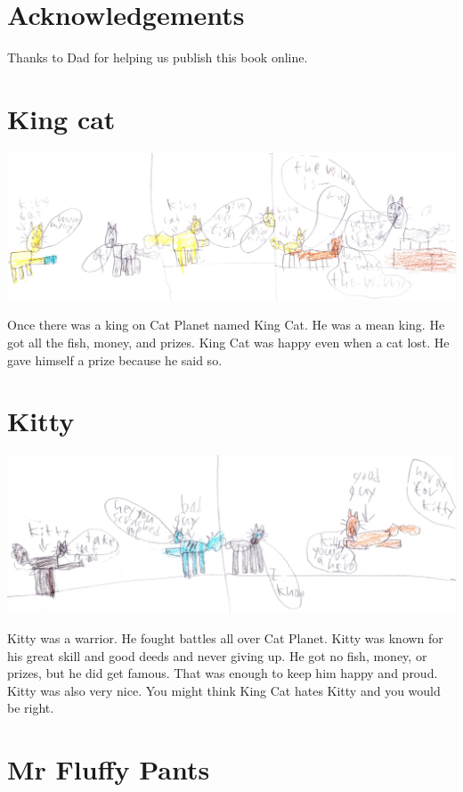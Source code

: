 \documentclass[12pt,oneside]{krantz}
\begin{document}
\hypertarget{acknowledgements}{%
\chapter*{Acknowledgements}\label{acknowledgements}}


Thanks to Dad for helping us publish this book online.

\hypertarget{king-cat}{%
\chapter{King cat}\label{king-cat}}

\includegraphics{img/thewinner.jpg}

Once there was a king on Cat Planet named King Cat. He was a mean king.
He got all the fish, money, and prizes. King Cat was happy even when a
cat lost. He gave himself a prize because he said so.

\hypertarget{kitty}{%
\chapter{Kitty}\label{kitty}}

\includegraphics{img/kittyhero.jpg}

Kitty was a warrior. He fought battles all over Cat Planet. Kitty was
known for his great skill and good deeds and never giving up. He got no
fish, money, or prizes, but he did get famous. That was enough to keep
him happy and proud. Kitty was also very nice. You might think King Cat
hates Kitty and you would be right.

\hypertarget{mr-fluffy-pants}{%
\chapter{Mr Fluffy Pants}\label{mr-fluffy-pants}}
\end{document}
